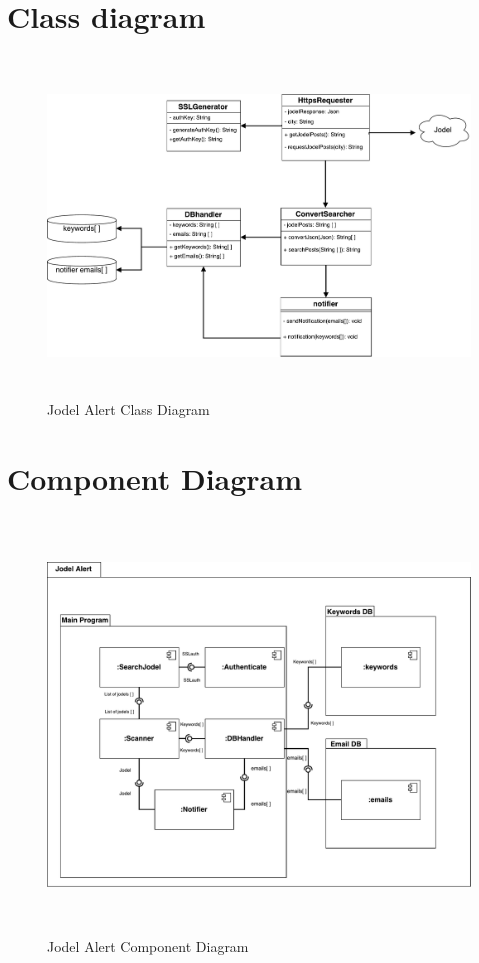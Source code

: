 \documentclass[a4paper,12pt]{article}
\begin{document}
\section{Class diagram}
\begin{figure}[!h]
	\centering
	\includegraphics[height=9cm]{img/jodelUML.pdf}
	\caption{Jodel Alert Class Diagram}
	\label{Jodel}
\end{figure}
\clearpage
\section{Component Diagram}
\begin{figure}[!h]
	\centering
	\includegraphics[height=11cm]{img/component_diagram.pdf}
	\caption{Jodel Alert Component Diagram}
	\label{Jodel}
\end{figure}
\clearpage
\end{document}
